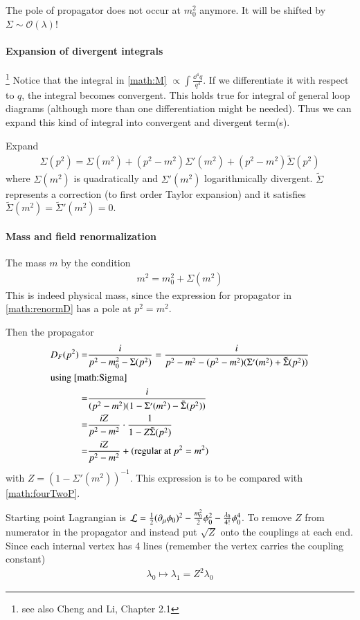 The pole of propagator does not occur at $m_0^2$ anymore. It will be shifted by $\Sigma \sim \mathcal{O}(\lambda)$!

\paragraph{Expansion of divergent integrals}\footnote{see also Cheng and Li, Chapter 2.1}
Notice that the integral in \ref{math:M} $\propto \int \frac{\dd^4 q}{q^4}$. If we differentiate it with respect to $q$, the integral becomes convergent. This holds true for integral of general loop diagrams (although more than one differentiation might be needed). Thus we can expand this kind of integral into convergent and divergent term(s).

Expand
\begin{align}\label{math:Sigma}
	\Sigma(p^2) = \Sigma(m^2) + (p^2 - m^2) \Sigma'(m^2) + (p^2 - m^2)\tilde{\Sigma}(p^2)
\end{align}
where $\Sigma(m^2)$ is quadratically and $\Sigma'(m^2)$ logarithmically divergent.
$\tilde{\Sigma}$ represents a correction (to first order Taylor expansion) and it satisfies $\tilde{\Sigma}(m^2) = \tilde{\Sigma}'(m^2) = 0$.

\paragraph{Mass and field renormalization}
The mass $m$ by the condition 
\begin{align}
	m^2	= m_0^2 + \Sigma(m^2)
\end{align}
This is indeed physical mass, since the expression for propagator in \ref{math:renormD} has a pole at $p^2 = m^2$.

Then the propagator
\begin{align}
	D_F(p^2) =& \frac{i}{p^2 - m^2_0 - \Sigma(p^2)} = \frac{i}{p^2 - m^2 - (p^2 - m^2)(\Sigma '(m^2) + \tilde{\Sigma}(p^2))} \notag \\
	\shortintertext{using \ref{math:Sigma}}
	=& \frac{i}{(p^2 - m^2)(1-\Sigma'(m^2)-\tilde{\Sigma}(p^2))} \notag\\
	=& \frac{iZ}{p^2 - m^2} \cdot \frac{1}{1-Z\tilde{\Sigma}(p^2)} \notag \\
	=& \frac{iZ}{p^2 - m^2} + \text{(regular at $p^2 = m^2$)}
\end{align}
with $Z = \left( 1 - \Sigma '(m^2) \right)^{-1}$. This expression is to be compared with \ref{math:fourTwoP}.

Starting point Lagrangian is $\mathcal{L} = \frac{1}{2}(\partial_\mu \phi_0)^2 - \frac{m^2_0}{2}\phi_0^2 - \frac{\lambda_0}{4!}\phi_0^4$. To remove $Z$ from numerator in the propagator and instead put $\sqrt{Z}$ onto the couplings at each end. Since each internal vertex has 4 lines (remember the vertex carries the coupling constant)
\begin{align}
	\lambda_0 \longmapsto \lambda_1 = Z^2 \lambda_0
\end{align}

